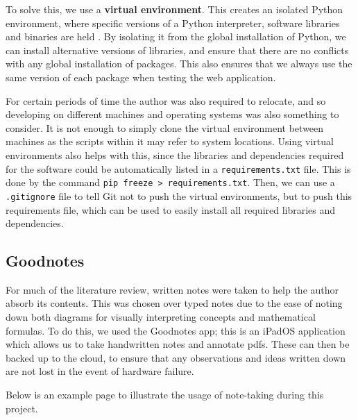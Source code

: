 To solve this, we use a \textbf{virtual environment}. This creates an isolated Python environment, where specific versions of a Python interpreter, software libraries and binaries are held \cite{venv}. By isolating it from the global installation of Python, we can install alternative versions of libraries, and ensure that there are no conflicts with any global installation of packages. This also ensures that we always use the same version of each package when testing the web application.

For certain periods of time the author was also required to relocate, and so developing on different machines and operating systems was also something to consider. It is not enough to simply clone the virtual environment between machines as the scripts within it may refer to system locations. Using virtual environments also helps with this, since the libraries and dependencies required for the software could be automatically listed in a \texttt{requirements.txt} file. This is done by the command \texttt{pip~freeze~>~requirements.txt}. Then, we can use a \texttt{.gitignore} file to tell Git not to push the virtual environments, but to push this requirements file, which can be used to easily install all required libraries and dependencies.

\subsection{Goodnotes}
For much of the literature review, written notes were taken to help the author absorb its contents. This was chosen over typed notes due to the ease of noting down both diagrams for visually interpreting concepts and mathematical formulas. To do this, we used the Goodnotes app; this is an iPadOS application which allows us to take handwritten notes and annotate pdfs. These can then be backed up to the cloud, to ensure that any observations and ideas written down are not lost in the event of hardware failure. 

Below is an example page to illustrate the usage of note-taking during this project.

